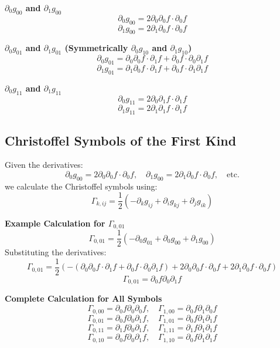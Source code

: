 \documentclass{article}
\begin{document}
\textbf{\( \partial_0 g_{00} \) and \( \partial_1 g_{00} \)}
\[
\partial_0 g_{00} = 2 \partial_0 \partial_0 f \cdot \partial_0 f
\]
\[
\partial_1 g_{00} = 2 \partial_1 \partial_0 f \cdot \partial_0 f
\]

\textbf{\( \partial_0 g_{01} \) and \( \partial_1 g_{01} \) (Symmetrically \( \partial_0 g_{10} \) and \( \partial_1 g_{10} \))}
\[
\partial_0 g_{01} = \partial_0 \partial_0 f \cdot \partial_1 f + \partial_0 f \cdot \partial_0 \partial_1 f
\]
\[
\partial_1 g_{01} = \partial_1 \partial_0 f \cdot \partial_1 f + \partial_0 f \cdot \partial_1 \partial_1 f
\]

\textbf{\( \partial_0 g_{11} \) and \( \partial_1 g_{11} \)}
\[
\partial_0 g_{11} = 2 \partial_0 \partial_1 f \cdot \partial_1 f
\]
\[
\partial_1 g_{11} = 2 \partial_1 \partial_1 f \cdot \partial_1 f
\]

\subsection{Christoffel Symbols of the First Kind}

Given the derivatives:
\[
\partial_0 g_{00} = 2 \partial_0 \partial_0 f \cdot \partial_0 f, \quad \partial_1 g_{00} = 2 \partial_1 \partial_0 f \cdot \partial_0 f, \quad \text{etc.}
\]
we calculate the Christoffel symbols using:
\[
\Gamma_{k,ij} = \frac{1}{2} \left( -\partial_k g_{ij} + \partial_i g_{kj} + \partial_j g_{ik} \right)
\]

\textbf{Example Calculation for \(\Gamma_{0,01}\)}
\[
\Gamma_{0,01} = \frac{1}{2} \left( -\partial_0 g_{01} + \partial_0 g_{00} + \partial_1 g_{00} \right)
\]
Substituting the derivatives:
\[
\Gamma_{0,01} = \frac{1}{2} \left( -(\partial_0 \partial_0 f \cdot \partial_1 f + \partial_0 f \cdot \partial_0 \partial_1 f) + 2 \partial_0 \partial_0 f \cdot \partial_0 f + 2 \partial_1 \partial_0 f \cdot \partial_0 f \right)
\]
\[
\Gamma_{0,01} = \partial_0 f \partial_0 \partial_1 f
\]

\textbf{Complete Calculation for All Symbols}
\[
\Gamma_{0,00} = \partial_0 f \partial_0 \partial_0 f, \quad \Gamma_{1,00} = \partial_0 f \partial_1 \partial_0 f
\]
\[
\Gamma_{0,01} = \partial_0 f \partial_0 \partial_1 f, \quad \Gamma_{1,01} = \partial_0 f \partial_1 \partial_1 f
\]
\[
\Gamma_{0,11} = \partial_1 f \partial_0 \partial_1 f, \quad \Gamma_{1,11} = \partial_1 f \partial_1 \partial_1 f
\]
\[
\Gamma_{0,10} = \partial_0 f \partial_0 \partial_1 f, \quad \Gamma_{1,10} = \partial_0 f \partial_1 \partial_1 f
\]
\end{document}
